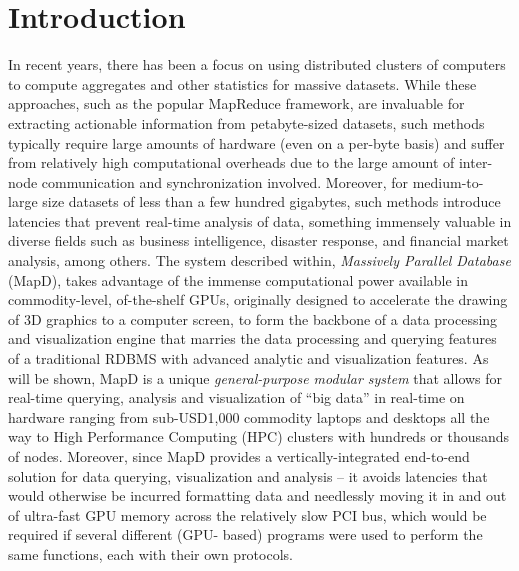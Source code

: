 \documentclass[twocolumn]{article}
\begin{document}
\section{Introduction}
In recent years, there has been a focus on using distributed clusters of computers to compute aggregates and other statistics for massive datasets. 
While these approaches, such as the popular MapReduce framework, are invaluable for extracting actionable information from petabyte-sized datasets, 
such methods typically require large amounts of hardware (even on a per-byte basis) and suffer from relatively high computational overheads due to the large amount of inter-node communication and synchronization involved. 
Moreover, for medium-to-large size datasets of less than a few hundred gigabytes, such methods introduce latencies that prevent real-time analysis of data, something immensely valuable in diverse fields such as business intelligence, disaster response, and financial market analysis, among others.
The system described within, \textit{Massively Parallel Database} (MapD), takes advantage of the immense computational power available in commodity-level, of-the-shelf GPUs, originally designed to accelerate the drawing of 3D graphics to a computer screen, to form the backbone of a data processing and visualization engine that marries the data processing and querying features of a traditional RDBMS with advanced analytic and visualization features. 
As will be shown, MapD is a unique \textit{general-purpose modular system} that allows for real-time querying, analysis and visualization of “big data” in real-time on hardware ranging from sub-USD1,000 commodity laptops and desktops all the way to High Performance Computing (HPC) clusters with hundreds or thousands of nodes. Moreover, since MapD provides a vertically-integrated end-to-end solution for data querying, visualization and analysis – it avoids latencies that would otherwise be incurred formatting data and needlessly moving it in and out of ultra-fast GPU memory across the relatively slow PCI bus, which would be required if several different (GPU- based) programs were used to perform the same functions, each with their own protocols.
\end{document}
